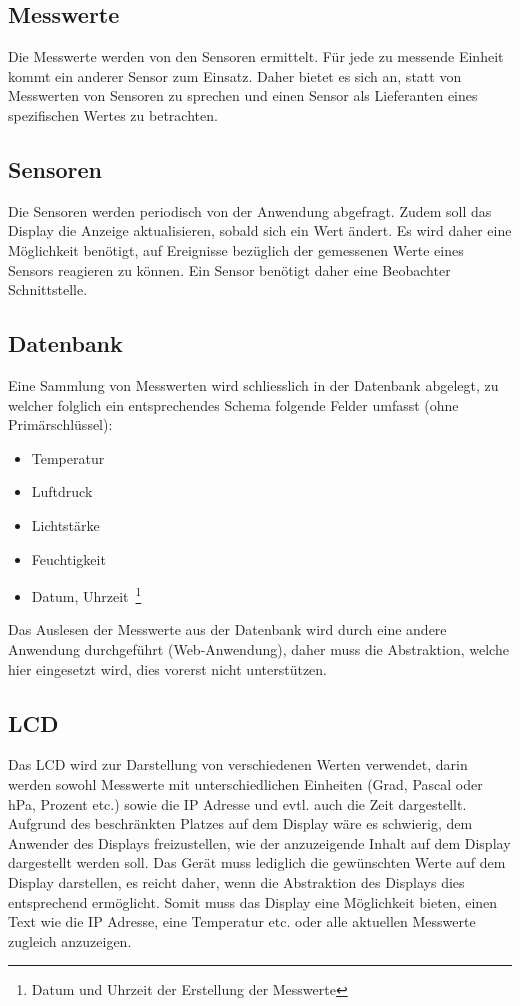\documentclass[
    10pt,
    a4paper,
]{scrartcl}
\begin{document}
\subsection{Messwerte}
Die Messwerte werden von den Sensoren ermittelt. Für jede zu messende Einheit kommt ein
anderer Sensor zum Einsatz. Daher bietet es sich an, statt von Messwerten von Sensoren zu
sprechen und einen Sensor als Lieferanten eines spezifischen Wertes zu betrachten.

\subsection{Sensoren}
Die Sensoren werden periodisch von der Anwendung abgefragt. Zudem soll das Display die
Anzeige aktualisieren, sobald sich ein Wert ändert. Es wird daher eine Möglichkeit
benötigt, auf Ereignisse bezüglich der gemessenen Werte eines Sensors reagieren zu können.
Ein Sensor benötigt daher eine Beobachter Schnittstelle.

\subsection{Datenbank}
Eine Sammlung von Messwerten wird schliesslich in der Datenbank abgelegt, zu welcher
folglich ein entsprechendes Schema folgende Felder umfasst (ohne Primärschlüssel):
\begin{itemize}
    \item Temperatur
    \item Luftdruck
    \item Lichtstärke
    \item Feuchtigkeit
    \item Datum, Uhrzeit~\footnote{Datum und Uhrzeit der Erstellung der Messwerte}
\end{itemize}

Das Auslesen der Messwerte aus der Datenbank wird durch eine andere Anwendung durchgeführt
(Web-Anwendung), daher muss die Abstraktion, welche hier eingesetzt wird, dies vorerst
nicht unterstützen.

\subsection{LCD}
Das LCD wird zur Darstellung von verschiedenen Werten verwendet, darin werden sowohl
Messwerte mit unterschiedlichen Einheiten (Grad, Pascal oder hPa, Prozent etc.) sowie die
IP Adresse und evtl. auch die Zeit dargestellt. Aufgrund des beschränkten Platzes auf dem
Display wäre es schwierig, dem Anwender des Displays freizustellen, wie der anzuzeigende
Inhalt auf dem Display dargestellt werden soll. Das Gerät muss lediglich die gewünschten
Werte auf dem Display darstellen, es reicht daher, wenn die Abstraktion des Displays dies
entsprechend ermöglicht. Somit muss das Display eine Möglichkeit bieten, einen Text wie
die IP Adresse, eine Temperatur etc. oder alle aktuellen Messwerte zugleich anzuzeigen.
\end{document}
